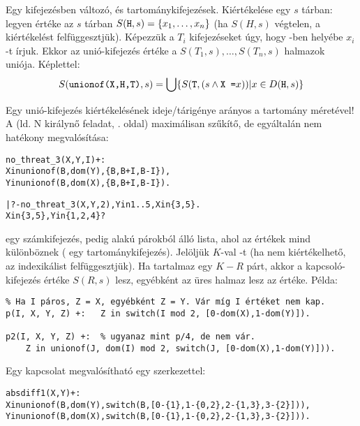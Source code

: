 \label{unio:ind}

Egy  kifejezésben  változó,  és 
tartománykifejezések. Kiértékelése egy $s$ tárban: legyen  értéke
az $s$ tárban $S(\texttt{H},s) = \{x_1, \ldots, x_n\}$ (ha $S(H,s)$ végtelen,
a kiértékelést felfüggesztjük). Képezzük a $T_i$ kifejezéseket úgy, hogy
-ben  helyébe $x_i$-t írjuk. Ekkor az unió-kifejezés értéke
a $S(T_1,s), \ldots, S(T_n,s)$ halmazok uniója. Képlettel:
\[
        S(\texttt{unionof(X,H,T)}, s) = \bigcup \{S(\texttt{T}, (s \wedge \texttt{X =}
        x)) | x \in D(\texttt{H}, s)\}
\]

Egy unió-kifejezés kiértékelésének ideje/tárigénye arányos a 
tartomány méretével!
\br
A  (ld. N királynő feladat, \pageref{no:threat}. oldal) maximálisan
szűkítő, de egyáltalán nem hatékony megvalósítása:

\begin{alltt}
no_threat_3(X, Y, I) +:
        X in unionof(B, dom(Y), \bs\{B,B+I,B-I\}),
        Y in unionof(B, dom(X), \bs\{B,B+I,B-I\}).

| ?- no_threat_3(X, Y, 2), Y in 1..5, X in \{3,5\}.
X in \{3,5\}, Y in \{1,2,4\} ?
\end{alltt}

\label{kapcs:ind}
 egy számkifejezés,  pedig 
alakú párokból álló lista, ahol az  értékek mind
különböznek ( egy tartománykifejezés). Jelöljük $K$-val -t
(ha  nem kiértékelhető, az indexikálist felfüggesztjük).
Ha  tartalmaz egy $K-R$ párt, akkor a kapcsoló-kifejezés értéke
$S(R,s)$ lesz, egyébként az üres halmaz lesz az értéke. Példa:

\begin{verbatim}
% Ha I páros, Z = X, egyébként Z = Y. Vár míg I értéket nem kap.
p(I, X, Y, Z) +:   Z in switch(I mod 2, [0-dom(X),1-dom(Y)]).

p2(I, X, Y, Z) +:  % ugyanaz mint p/4, de nem vár.
    Z in unionof(J, dom(I) mod 2, switch(J, [0-dom(X),1-dom(Y)])).
\end{verbatim}

Egy  kapcsolat megvalósítható egy  szerkezettel:

\begin{alltt}
% relation(X, [0-\{1\},1-\{0,2\},2-\{1,3\},3-\{2\}], Y) \(\Leftrightarrow |x-y|=1 x,y\in[0,3]\)
absdiff1(X, Y) +:
  X in unionof(B,dom(Y),switch(B,[0-\{1\},1-\{0,2\},2-\{1,3\},3-\{2\}])),
  Y in unionof(B,dom(X),switch(B,[0-\{1\},1-\{0,2\},2-\{1,3\},3-\{2\}])).
\end{alltt}

